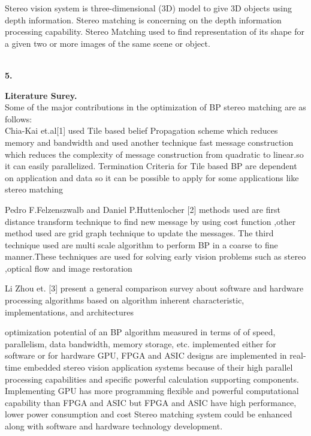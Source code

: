 {{{{{{{{{Stereo  vision system is three-dimensional (3D) model to give 3D objects using depth information. Stereo matching is concerning on the depth information processing capability. Stereo Matching used to find representation of its shape for a given two or more images of the same scene or object.\\\\
{\Large\textbf{5.} \vspace{0.5in} {\Large\textbf{Literature Surey.}\\
Some of the major contributions in the optimization of BP stereo matching are as follows:\\
Chia-Kai et.al[1] used Tile based belief Propagation scheme which reduces memory
 and bandwidth and used another technique fast message construction which reduces the complexity of message construction from quadratic to linear.so it can easily parallelized.
Termination Criteria for Tile based BP are dependent on application and data so it can be possible to apply for some applications like stereo matching

Pedro F.Felzenszwalb and Daniel P.Huttenlocher [2] methods used are first distance transform technique to find new message by using cost function ,other method used are grid graph technique to update the messages.
The third technique used are multi scale algorithm to perform BP in a coarse to fine manner.These techniques are used for solving early vision problems such as stereo ,optical flow and image restoration

Li Zhou et. [3] present a general comparison survey about software and hardware processing algorithms based on algorithm inherent characteristic, implementations, and architectures

optimization potential of an BP algorithm measured  in terms of
of speed, parallelism, data bandwidth, memory storage, etc. implemented either for  software or  for hardware
 GPU, FPGA and ASIC designs are  implemented in real-time embedded stereo vision application systems because of their high parallel processing capabilities and specific powerful calculation supporting components.
Implementing GPU has more programming flexible and powerful computational capability than FPGA and ASIC but FPGA and ASIC  have high performance, lower power consumption and cost
Stereo matching system could be enhanced along with software and hardware technology development.


}}}}}}}}}}}
